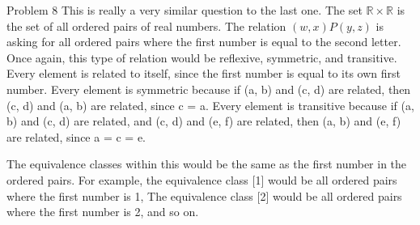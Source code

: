 \documentclass[12pt]{article}
\begin{document}
    \begin{problem}{Problem 8}
        This is really a very similar question to the last one. The set $\mathbb{R} \times \mathbb{R}$ is the set of all ordered pairs of real numbers.
        The relation $(w,x)P(y,z)$ is asking for all ordered pairs where the first number is equal to the second letter. Once again, this type of relation
        would be reflexive, symmetric, and transitive. Every element is related to itself, since the first number is equal to its own first number. Every element
        is symmetric because if (a, b) and (c, d) are related, then (c, d) and (a, b) are related, since c = a. Every element is transitive because if (a, b) and (c, d)
        are related, and (c, d) and (e, f) are related, then (a, b) and (e, f) are related, since a = c = e.

        The equivalence classes within this would be the same as the first number in the ordered pairs. For example, the equivalence class [1] would be all ordered pairs
        where the first number is 1, The equivalence class [2] would be all ordered pairs where the first number is 2, and so on.
    \end{problem}
\end{document}
